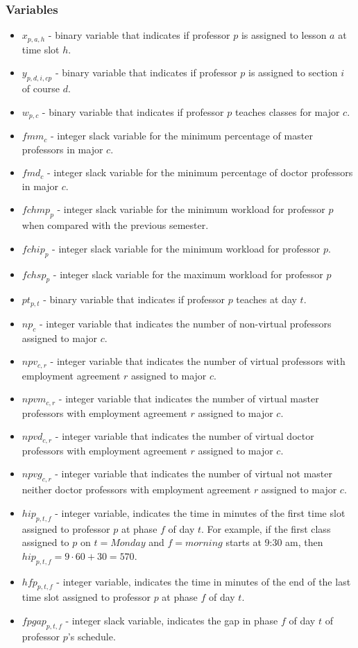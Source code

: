 \subsubsection{Variables}
\begin{itemize}
\item $x_{p,a,h}$ - binary variable that indicates if professor $p$ is assigned to lesson $a$ at time slot $h$.
\item $y_{p,d,i,cp}$ - binary variable that indicates if professor $p$ is assigned to section $i$ of course $d$.
\item $w_{p,c}$ - binary variable that indicates if professor $p$ teaches classes for major $c$.
\item $fmm_{c}$ - integer slack variable for the minimum percentage of master professors in major $c$.
\item $fmd_{c}$ - integer slack variable for the minimum percentage of doctor professors in major $c$.
\item $fchmp_{p}$ - integer slack variable for the minimum workload for professor $p$ when compared with the previous semester.
\item $fchip_{p}$ - integer slack variable for the minimum workload for professor $p$.
\item $fchsp_{p}$ - integer slack variable for the maximum workload for professor $p$
\item $pt_{p,t}$ - binary variable that indicates if professor $p$ teaches at day $t$.
\item $np_{c}$ - integer variable that indicates the number of non-virtual professors assigned to major $c$.
\item $npv_{c,r}$ - integer variable that indicates the number of virtual professors with employment agreement $r$ assigned to major $c$.
\item $npvm_{c,r}$ - integer variable that indicates the number of virtual master professors with employment agreement $r$ assigned to major $c$.
\item $npvd_{c,r}$ - integer variable that indicates the number of virtual doctor professors with employment agreement $r$ assigned to major $c$.
\item $npvg_{c,r}$ - integer variable that indicates the number of virtual not master neither doctor professors with employment agreement $r$ assigned to major $c$.
\item $hip_{p,t,f}$ - integer variable, indicates the time in minutes of the first time slot assigned to professor $p$ at phase $f$ of day $t$. For example, if the first class assigned to $p$ on $t=Monday$ and $f=morning$ starts at 9:30 am, then $hip_{p,t,f}=9\cdot 60 + 30 = 570$.
\item $hfp_{p,t,f}$ - integer variable, indicates the time in minutes of the end of the last time slot assigned to professor $p$ at phase $f$ of day $t$.
\item $fpgap_{p,t,f}$ - integer slack variable, indicates the gap in phase $f$ of day $t$ of professor $p$'s schedule.
\end{itemize}


